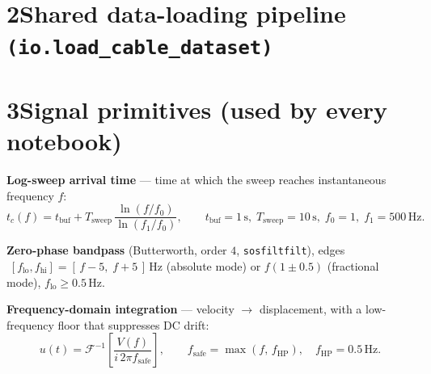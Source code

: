 \documentclass[11pt,a4paper]{article}
\newcommand{\unit}[1]{\,\mathrm{#1}}
\begin{document}
\section*{2\quad Shared data-loading pipeline \texttt{(io.load\_cable\_dataset)}}
\begin{center}
\end{center}

\section*{3\quad Signal primitives (used by every notebook)}
\textbf{Log-sweep arrival time} --- time at which the sweep reaches instantaneous frequency $f$:
\begin{equation}
t_c(f)=t_{\mathrm{buf}}+T_{\mathrm{sweep}}\,\frac{\ln(f/f_0)}{\ln(f_1/f_0)},\qquad
t_{\mathrm{buf}}=1\unit{s},\;T_{\mathrm{sweep}}=10\unit{s},\;f_0=1,\;f_1=500\unit{Hz}.
\end{equation}

\textbf{Zero-phase bandpass} (Butterworth, order $4$, \texttt{sosfiltfilt}), edges
$\;[f_{\mathrm{lo}},f_{\mathrm{hi}}]=[\,f-5,\;f+5\,]\unit{Hz}$ (absolute mode) or $f(1\pm0.5)$ (fractional mode), $f_{\mathrm{lo}}\ge0.5\unit{Hz}$.

\textbf{Frequency-domain integration} --- velocity $\to$ displacement, with a low-frequency floor that suppresses DC drift:
\begin{equation}
u(t)=\mathcal{F}^{-1}\!\left[\frac{V(f)}{i\,2\pi f_{\mathrm{safe}}}\right],
\qquad f_{\mathrm{safe}}=\max(f,\,f_{\mathrm{HP}}),\quad f_{\mathrm{HP}}=0.5\unit{Hz}.
\end{equation}
\end{document}
